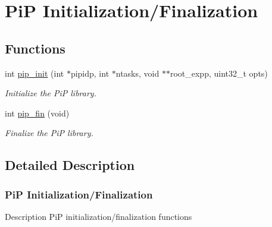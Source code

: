 \hypertarget{group__PiP-0-init-fin}{\section{Pi\-P Initialization/\-Finalization}
\label{group__PiP-0-init-fin}
}
\subsection*{Functions}
\begin{DoxyCompactItemize}
\item 
int \hyperlink{group__PiP-0-init-fin_ga20439326ff318c2dd0752bd544dca0e2}{pip\-\_\-init} (int $\ast$pipidp, int $\ast$ntasks, void $\ast$$\ast$root\-\_\-expp, uint32\-\_\-t opts)
\begin{DoxyCompactList}\small\item\em Initialize the Pi\-P library. \end{DoxyCompactList}\item 
int \hyperlink{group__PiP-0-init-fin_gac4654282785abb9434ce81573fdf16ed}{pip\-\_\-fin} (void)
\begin{DoxyCompactList}\small\item\em Finalize the Pi\-P library. \end{DoxyCompactList}\end{DoxyCompactItemize}


\subsection{Detailed Description}
\hypertarget{pip-intialize-finalize}{}\subsubsection{Pi\-P Initialization/\-Finalization}\label{pip-intialize-finalize}
\begin{DoxyParagraph}{Description}
Pi\-P initialization/finalization functions 
\end{DoxyParagraph}



